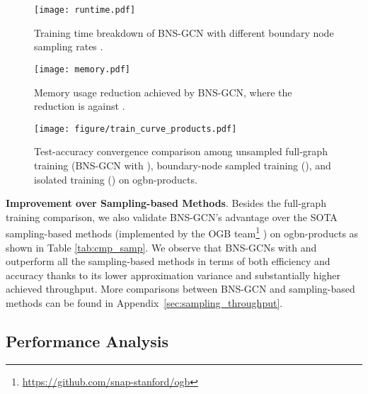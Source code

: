 \documentclass{article}
\newcommand{\niparagraph}[1]{\noindent\textbf{#1}}
\begin{document}
\renewcommand{\thefootnote}{\fnsymbol{footnote}}
\renewcommand{\thefootnote}{\arabic{footnote}}

\begin{figure*}[t]
\centering
\begin{minipage}{.5\textwidth}
  \centering
  \texttt{[image: runtime.pdf]}
  \caption{Training time breakdown of BNS-GCN with different boundary node sampling rates .} 
  \label{fig:comm}
\end{minipage}\begin{minipage}{.5\textwidth}
  \centering
  \texttt{[image: memory.pdf]}
  \caption{Memory usage reduction achieved by BNS-GCN, where the reduction is against .}
  \label{fig:mem}
\end{minipage}
\end{figure*}


\begin{figure*}[t]
  \centering
  \texttt{[image: figure/train\_curve\_products.pdf]}
  \caption{Test-accuracy convergence comparison among unsampled full-graph training (BNS-GCN with ), boundary-node sampled training (), and isolated training () on ogbn-products.} 
  \label{fig:convergence_epoch}
\end{figure*}


\niparagraph{Improvement over Sampling-based Methods}.
Besides the full-graph training comparison, we also validate BNS-GCN's advantage over the SOTA sampling-based methods (implemented by the OGB team\footnote{\href{https://github.com/snap-stanford/ogb}{https://github.com/snap-stanford/ogb}} \citep{hu2020open}) on ogbn-products as shown in Table \ref{tab:cmp_samp}.
We observe that BNS-GCNs with  and  outperform all the sampling-based methods in terms of both efficiency and accuracy thanks to its lower approximation variance and substantially higher achieved throughput. 
More comparisons between BNS-GCN and sampling-based methods can be found in Appendix~\ref{sec:sampling_throughput}.


\subsection{Performance Analysis}
\end{document}
